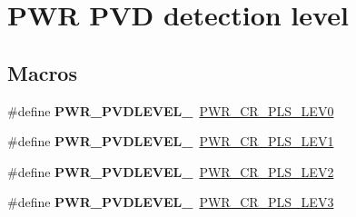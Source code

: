 \hypertarget{group___p_w_r___p_v_d__detection__level}{}\section{P\+WR P\+VD detection level}
\label{group___p_w_r___p_v_d__detection__level}
\subsection*{Macros}
\begin{DoxyCompactItemize}
\item 
\mbox{\label{group___p_w_r___p_v_d__detection__level_gaddf4616a143ac3481f3043f2a4c21c18}} 
\#define {\bfseries P\+W\+R\+\_\+\+P\+V\+D\+L\+E\+V\+E\+L\+\_}~\mbox{\hyperlink{group___peripheral___registers___bits___definition_gacb6b904b20d7e4fff958c75748861216}{P\+W\+R\+\_\+\+C\+R\+\_\+\+P\+L\+S\+\_\+\+L\+E\+V0}}
\item 
\mbox{\label{group___p_w_r___p_v_d__detection__level_ga06e55b20a8777594f1a91ee71fac1f79}} 
\#define {\bfseries P\+W\+R\+\_\+\+P\+V\+D\+L\+E\+V\+E\+L\+\_}~\mbox{\hyperlink{group___peripheral___registers___bits___definition_ga15b71263f73f0c4e53ca91fc8d096818}{P\+W\+R\+\_\+\+C\+R\+\_\+\+P\+L\+S\+\_\+\+L\+E\+V1}}
\item 
\mbox{\label{group___p_w_r___p_v_d__detection__level_gab26bb78650bbaef26ac9f9123c791cc7}} 
\#define {\bfseries P\+W\+R\+\_\+\+P\+V\+D\+L\+E\+V\+E\+L\+\_}~\mbox{\hyperlink{group___peripheral___registers___bits___definition_ga2ea128abc2fc4252b53d09ca2850e69e}{P\+W\+R\+\_\+\+C\+R\+\_\+\+P\+L\+S\+\_\+\+L\+E\+V2}}
\item 
\mbox{\label{group___p_w_r___p_v_d__detection__level_ga7b751743b3e29c237e6a0e1d7bdd0503}} 
\#define {\bfseries P\+W\+R\+\_\+\+P\+V\+D\+L\+E\+V\+E\+L\+\_}~\mbox{\hyperlink{group___peripheral___registers___bits___definition_ga9c1782980a2fb12de80058729a74f174}{P\+W\+R\+\_\+\+C\+R\+\_\+\+P\+L\+S\+\_\+\+L\+E\+V3}}
\item 
\mbox{\label{group___p_w_r___p_v_d__detection__level_ga03c0d3ae547deb1a51b8acafac101698}} 

\end{DoxyCompactItemize}
